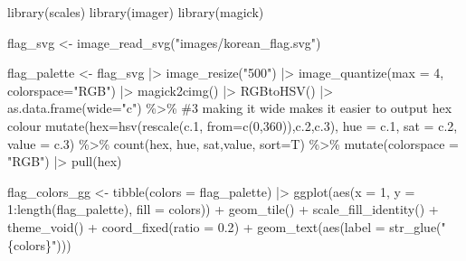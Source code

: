 \documentclass[
  letterpaper,
]{book}
\newenvironment{Shaded}{\begin{snugshade}}{\end{snugshade}}
\newcommand{\AttributeTok}[1]{\textcolor[rgb]{0.40,0.45,0.13}{#1}}
\newcommand{\CommentTok}[1]{\textcolor[rgb]{0.37,0.37,0.37}{#1}}
\newcommand{\DecValTok}[1]{\textcolor[rgb]{0.68,0.00,0.00}{#1}}
\newcommand{\FloatTok}[1]{\textcolor[rgb]{0.68,0.00,0.00}{#1}}
\newcommand{\FunctionTok}[1]{\textcolor[rgb]{0.28,0.35,0.67}{#1}}
\newcommand{\NormalTok}[1]{\textcolor[rgb]{0.00,0.23,0.31}{#1}}
\newcommand{\OtherTok}[1]{\textcolor[rgb]{0.00,0.23,0.31}{#1}}
\newcommand{\SpecialCharTok}[1]{\textcolor[rgb]{0.37,0.37,0.37}{#1}}
\newcommand{\StringTok}[1]{\textcolor[rgb]{0.13,0.47,0.30}{#1}}
\begin{document}
\begin{Shaded}
\begin{Highlighting}[]
\FunctionTok{library}\NormalTok{(scales)}
\FunctionTok{library}\NormalTok{(imager)}
\FunctionTok{library}\NormalTok{(magick)}

\NormalTok{flag\_svg }\OtherTok{\textless{}{-}} \FunctionTok{image\_read\_svg}\NormalTok{(}\StringTok{"images/korean\_flag.svg"}\NormalTok{)}

\NormalTok{flag\_palette }\OtherTok{\textless{}{-}}\NormalTok{ flag\_svg }\SpecialCharTok{|\textgreater{}} 
  \FunctionTok{image\_resize}\NormalTok{(}\StringTok{"500"}\NormalTok{) }\SpecialCharTok{|\textgreater{}} 
  \FunctionTok{image\_quantize}\NormalTok{(}\AttributeTok{max =} \DecValTok{4}\NormalTok{, }\AttributeTok{colorspace=}\StringTok{"RGB"}\NormalTok{) }\SpecialCharTok{|\textgreater{}} 
  \FunctionTok{magick2cimg}\NormalTok{() }\SpecialCharTok{|\textgreater{}} 
  \FunctionTok{RGBtoHSV}\NormalTok{() }\SpecialCharTok{|\textgreater{}} 
  \FunctionTok{as.data.frame}\NormalTok{(}\AttributeTok{wide=}\StringTok{"c"}\NormalTok{) }\SpecialCharTok{\%\textgreater{}\%}  \CommentTok{\#3 making it wide makes it easier to output hex colour}
  \FunctionTok{mutate}\NormalTok{(}\AttributeTok{hex=}\FunctionTok{hsv}\NormalTok{(}\FunctionTok{rescale}\NormalTok{(c}\FloatTok{.1}\NormalTok{, }\AttributeTok{from=}\FunctionTok{c}\NormalTok{(}\DecValTok{0}\NormalTok{,}\DecValTok{360}\NormalTok{)),c}\FloatTok{.2}\NormalTok{,c}\FloatTok{.3}\NormalTok{),}
         \AttributeTok{hue =}\NormalTok{ c}\FloatTok{.1}\NormalTok{,}
         \AttributeTok{sat =}\NormalTok{ c}\FloatTok{.2}\NormalTok{,}
         \AttributeTok{value =}\NormalTok{ c}\FloatTok{.3}\NormalTok{) }\SpecialCharTok{\%\textgreater{}\%}
  \FunctionTok{count}\NormalTok{(hex, hue, sat,value, }\AttributeTok{sort=}\NormalTok{T) }\SpecialCharTok{\%\textgreater{}\%} 
  \FunctionTok{mutate}\NormalTok{(}\AttributeTok{colorspace =} \StringTok{"RGB"}\NormalTok{) }\SpecialCharTok{|\textgreater{}} 
  \FunctionTok{pull}\NormalTok{(hex)}

\NormalTok{flag\_colors\_gg }\OtherTok{\textless{}{-}} \FunctionTok{tibble}\NormalTok{(}\AttributeTok{colors =}\NormalTok{ flag\_palette) }\SpecialCharTok{|\textgreater{}} 
  \FunctionTok{ggplot}\NormalTok{(}\FunctionTok{aes}\NormalTok{(}\AttributeTok{x =} \DecValTok{1}\NormalTok{, }\AttributeTok{y =} \DecValTok{1}\SpecialCharTok{:}\FunctionTok{length}\NormalTok{(flag\_palette), }\AttributeTok{fill =}\NormalTok{ colors)) }\SpecialCharTok{+} 
    \FunctionTok{geom\_tile}\NormalTok{() }\SpecialCharTok{+}
    \FunctionTok{scale\_fill\_identity}\NormalTok{() }\SpecialCharTok{+}
    \FunctionTok{theme\_void}\NormalTok{() }\SpecialCharTok{+} 
    \FunctionTok{coord\_fixed}\NormalTok{(}\AttributeTok{ratio =} \FloatTok{0.2}\NormalTok{) }\SpecialCharTok{+}
    \FunctionTok{geom\_text}\NormalTok{(}\FunctionTok{aes}\NormalTok{(}\AttributeTok{label =} \FunctionTok{str\_glue}\NormalTok{(}\StringTok{"\{colors\}"}\NormalTok{)))  }
\end{Highlighting}
\end{Shaded}
\end{document}
